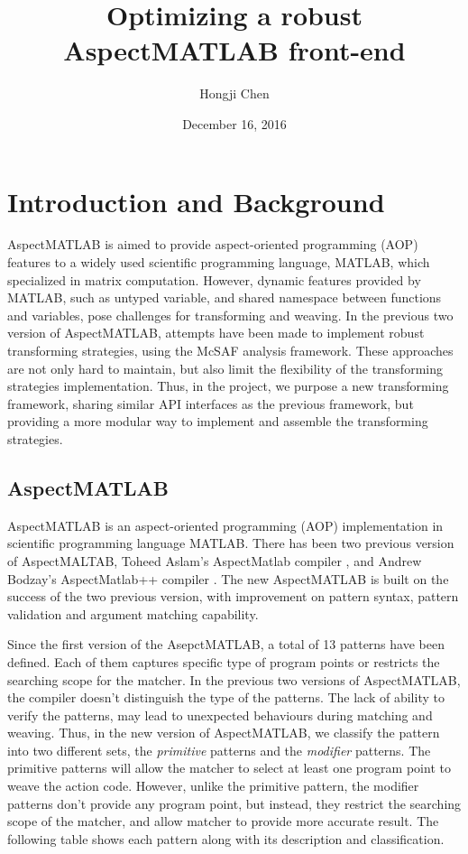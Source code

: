 \documentclass{comp621}
\title{Optimizing a robust AspectMATLAB front-end}
\author{Hongji Chen}
\date{December 16, 2016}
\begin{document}
\MakeTitlePage

\tableofcontents

\listoffigures 
\listoftables 

\clearpage
\section{Introduction and Background}

AspectMATLAB is aimed to provide aspect-oriented programming (AOP) features to
a widely used scientific programming language, MATLAB, which specialized in
matrix computation. However, dynamic features provided by MATLAB, such as
untyped variable, and shared namespace between functions and variables, pose
challenges for transforming and weaving. In the previous two version of
AspectMATLAB, attempts have been made to implement robust transforming
strategies, using the McSAF analysis framework. These approaches are not only
hard to maintain, but also limit the flexibility of the transforming strategies
implementation. Thus, in the project, we purpose a new transforming framework,
sharing similar API interfaces as the previous framework, but providing a more
modular way to implement and assemble the transforming strategies.

\subsection{AspectMATLAB}
AspectMATLAB is an aspect-oriented programming (AOP) implementation in
scientific programming language MATLAB. There has been two previous version of
AspectMALTAB, Toheed Aslam's AspectMatlab compiler \cite{toheed_aspectmatlab},
and Andrew Bodzay's AspectMatlab++ compiler \cite{andrew_aspectmatlb}. The new
AspectMATLAB is built on the success of the two previous version, with
improvement on pattern syntax, pattern validation and argument matching
capability.
 
Since the first version of the AsepctMATLAB, a total of 13 patterns have been
defined. Each of them captures specific type of program points or restricts the
searching scope for the matcher. In the previous two versions of AspectMATLAB,
the compiler doesn't distinguish the type of the patterns. The lack of ability
to verify the patterns, may lead to unexpected behaviours during matching and
weaving. Thus, in the new version of AspectMATLAB, we classify the pattern into
two different sets, the \emph{primitive} patterns and the \emph{modifier}
patterns. The primitive patterns will allow the matcher to select at least one
program point to weave the action code. However, unlike the primitive pattern,
the modifier patterns don't provide any program point, but instead, they
restrict the searching scope of the matcher, and allow matcher to provide more
accurate result. The following table shows each pattern along with its
description and classification.
\end{document}
